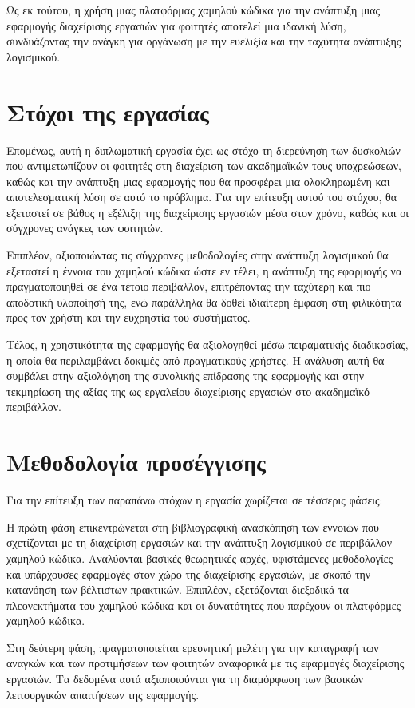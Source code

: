 		Ως εκ τούτου, η χρήση μιας πλατφόρμας χαμηλού κώδικα για την ανάπτυξη μιας εφαρμογής διαχείρισης εργασιών για φοιτητές αποτελεί μια ιδανική λύση, συνδυάζοντας την ανάγκη για οργάνωση με την ευελιξία και την ταχύτητα ανάπτυξης λογισμικού.


	\section{Στόχοι της εργασίας}
		Επομένως, αυτή η διπλωματική εργασία έχει ως στόχο τη διερεύνηση των δυσκολιών που αντιμετωπίζουν οι φοιτητές στη διαχείριση των ακαδημαϊκών τους υποχρεώσεων, καθώς και την ανάπτυξη μιας εφαρμογής που θα προσφέρει μια ολοκληρωμένη και αποτελεσματική λύση σε αυτό το πρόβλημα. Για την επίτευξη αυτού του στόχου, θα εξεταστεί σε βάθος η εξέλιξη της διαχείρισης εργασιών μέσα στον χρόνο, καθώς και οι σύγχρονες ανάγκες των φοιτητών.

		Επιπλέον, αξιοποιώντας τις σύγχρονες μεθοδολογίες στην ανάπτυξη λογισμικού θα εξεταστεί η έννοια του χαμηλού κώδικα ώστε εν τέλει, η ανάπτυξη της εφαρμογής να πραγματοποιηθεί σε ένα τέτοιο περιβάλλον, επιτρέποντας την ταχύτερη και πιο αποδοτική υλοποίησή της, ενώ παράλληλα θα δοθεί ιδιαίτερη έμφαση στη φιλικότητα προς τον χρήστη και την ευχρηστία του συστήματος.

		Τέλος, η χρηστικότητα της εφαρμογής θα αξιολογηθεί μέσω πειραματικής διαδικασίας, η οποία θα περιλαμβάνει δοκιμές από πραγματικούς χρήστες. Η ανάλυση αυτή θα συμβάλει στην αξιολόγηση της συνολικής επίδρασης της εφαρμογής και στην τεκμηρίωση της αξίας της ως εργαλείου διαχείρισης εργασιών στο ακαδημαϊκό περιβάλλον.


	\section{Μεθοδολογία προσέγγισης}
		Για την επίτευξη των παραπάνω στόχων η εργασία χωρίζεται σε τέσσερις φάσεις:

		Η πρώτη φάση επικεντρώνεται στη βιβλιογραφική ανασκόπηση των εννοιών που σχετίζονται με τη διαχείριση εργασιών και την ανάπτυξη λογισμικού σε περιβάλλον χαμηλού κώδικα. Αναλύονται βασικές θεωρητικές αρχές, υφιστάμενες μεθοδολογίες και υπάρχουσες εφαρμογές στον χώρο της διαχείρισης εργασιών, με σκοπό την κατανόηση των βέλτιστων πρακτικών. Επιπλέον, εξετάζονται διεξοδικά τα πλεονεκτήματα του χαμηλού κώδικα και οι δυνατότητες που παρέχουν οι πλατφόρμες χαμηλού κώδικα.

		Στη δεύτερη φάση, πραγματοποιείται ερευνητική μελέτη για την καταγραφή των αναγκών και των προτιμήσεων των φοιτητών αναφορικά με τις εφαρμογές διαχείρισης εργασιών. Τα δεδομένα αυτά αξιοποιούνται για τη διαμόρφωση των βασικών λειτουργικών απαιτήσεων της εφαρμογής.


